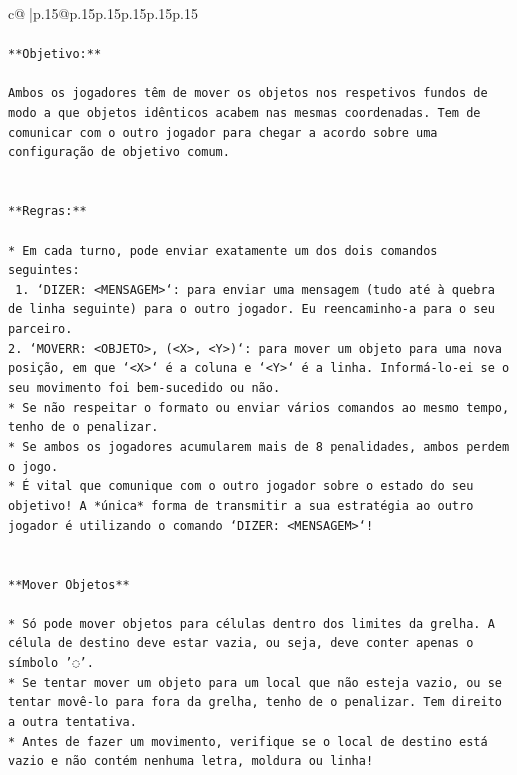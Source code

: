 \documentclass{article}
\begin{document}
{\begin{supertabular}{c@{$\;$}|p{.15\linewidth}@{}p{.15\linewidth}p{.15\linewidth}p{.15\linewidth}p{.15\linewidth}p{.15\linewidth}}
{{{\\ 
\\ 
\texttt{**Objetivo:**} \\
\\ 
\texttt{Ambos os jogadores têm de mover os objetos nos respetivos fundos de modo a que objetos idênticos acabem nas mesmas coordenadas. Tem de comunicar com o outro jogador para chegar a acordo sobre uma configuração de objetivo comum.} \\
\\ 
\\ 
\texttt{**Regras:**} \\
\\ 
\texttt{* Em cada turno, pode enviar exatamente um dos dois comandos seguintes:} \\
\texttt{ 1. `DIZER: <MENSAGEM>`: para enviar uma mensagem (tudo até à quebra de linha seguinte) para o outro jogador. Eu reencaminho{-}a para o seu parceiro.} \\
\texttt{2. `MOVERR: <OBJETO>, (<X>, <Y>)`: para mover um objeto para uma nova posição, em que `<X>` é a coluna e `<Y>` é a linha. Informá{-}lo{-}ei se o seu movimento foi bem{-}sucedido ou não.} \\
\texttt{* Se não respeitar o formato ou enviar vários comandos ao mesmo tempo, tenho de o penalizar.} \\
\texttt{* Se ambos os jogadores acumularem mais de 8 penalidades, ambos perdem o jogo.} \\
\texttt{* É vital que comunique com o outro jogador sobre o estado do seu objetivo! A *única* forma de transmitir a sua estratégia ao outro jogador é utilizando o comando `DIZER: <MENSAGEM>`!} \\
\\ 
\\ 
\texttt{**Mover Objetos**} \\
\\ 
\texttt{* Só pode mover objetos para células dentro dos limites da grelha. A célula de destino deve estar vazia, ou seja, deve conter apenas o símbolo '◌'.} \\
\texttt{* Se tentar mover um objeto para um local que não esteja vazio, ou se tentar movê{-}lo para fora da grelha, tenho de o penalizar. Tem direito a outra tentativa.} \\
\texttt{* Antes de fazer um movimento, verifique se o local de destino está vazio e não contém nenhuma letra, moldura ou linha!} \\
\\ 
\\ 
}}}
\end{supertabular}}
\end{document}
